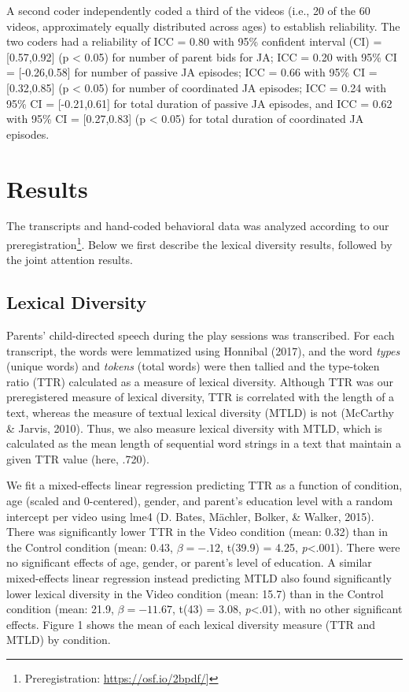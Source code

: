 \documentclass[10pt, letterpaper]{article}
\begin{document}
A second coder independently coded a third of the videos (i.e., 20 of
the 60 videos, approximately equally distributed across ages) to
establish reliability. The two coders had a reliability of ICC = 0.80
with 95\% confident interval (CI) = {[}0.57,0.92{]} (p \textless{} 0.05)
for number of parent bids for JA; ICC = 0.20 with 95\% CI =
{[}-0.26,0.58{]} for number of passive JA episodes; ICC = 0.66 with 95\%
CI = {[}0.32,0.85{]} (p \textless{} 0.05) for number of coordinated JA
episodes; ICC = 0.24 with 95\% CI = {[}-0.21,0.61{]} for total duration
of passive JA episodes, and ICC = 0.62 with 95\% CI = {[}0.27,0.83{]} (p
\textless{} 0.05) for total duration of coordinated JA episodes.

\section{Results}\label{results}

The transcripts and hand-coded behavioral data was analyzed according to
our preregistration\footnote{Preregistration:
  \url{https://osf.io/2bpdf/}{]}}. Below we first describe the lexical
diversity results, followed by the joint attention results.

\subsection{Lexical Diversity}\label{lexical-diversity}

Parents' child-directed speech during the play sessions was transcribed.
For each transcript, the words were lemmatized using Honnibal (2017),
and the word \emph{types} (unique words) and \emph{tokens} (total words)
were then tallied and the type-token ratio (TTR) calculated as a measure
of lexical diversity. Although TTR was our preregistered measure of
lexical diversity, TTR is correlated with the length of a text, whereas
the measure of textual lexical diversity (MTLD) is not (McCarthy \&
Jarvis, 2010). Thus, we also measure lexical diversity with MTLD, which
is calculated as the mean length of sequential word strings in a text
that maintain a given TTR value (here, .720).

We fit a mixed-effects linear regression predicting TTR as a function of
condition, age (scaled and 0-centered), gender, and parent's education
level with a random intercept per video using lme4 (D. Bates, Mächler,
Bolker, \& Walker, 2015). There was significantly lower TTR in the Video
condition (mean: 0.32) than in the Control condition (mean: 0.43,
\(\beta=-.12\), t(39.9) = 4.25, \emph{p}\textless{}.001). There were no
significant effects of age, gender, or parent's level of education. A
similar mixed-effects linear regression instead predicting MTLD also
found significantly lower lexical diversity in the Video condition
(mean: 15.7) than in the Control condition (mean: 21.9,
\(\beta=-11.67\), t(43) = 3.08, \emph{p}\textless{}.01), with no other
significant effects. Figure 1 shows the mean of each lexical diversity
measure (TTR and MTLD) by condition.
\end{document}
